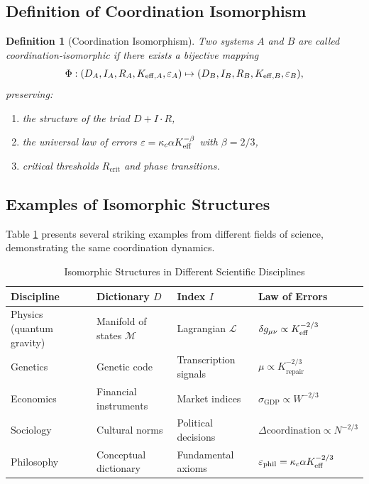 \documentclass[12pt,a4paper]{article}
\newcommand{\kappac}{\kappa_c}
\newcommand{\eps}{\varepsilon}
\newcommand{\betaf}{\beta}
\newcommand{\Rcrit}{R_{\mathrm{crit}}}
\newtheorem{definition}{Definition}[section]
\begin{document}
	\subsection{Definition of Coordination Isomorphism}
	
	\begin{definition}[Coordination Isomorphism]
		Two systems \(A\) and \(B\) are called coordination-isomorphic if there exists a bijective mapping
		\[
		\Phi: (D_A, I_A, R_A, \Keff[A], \eps_A) \mapsto (D_B, I_B, R_B, \Keff[B], \eps_B),
		\]
		preserving:
		\begin{enumerate}
			\item the structure of the triad \(D+I\cdot R\),
			\item the universal law of errors \(\eps = \kappac \alpha \Keff^{-\betaf}\) with \(\betaf = 2/3\),
			\item critical thresholds \(\Rcrit\) and phase transitions.
		\end{enumerate}
	\end{definition}
	
	\subsection{Examples of Isomorphic Structures}
	
	Table \ref{tab:isomorphisms} presents several striking examples from different fields of science, demonstrating the same coordination dynamics.
	
	\begin{table}[H]
		\centering
		\caption{Isomorphic Structures in Different Scientific Disciplines}
		\label{tab:isomorphisms}
		\footnotesize
		\begin{tabular}{p{2.8cm}p{3cm}p{3cm}p{3.5cm}}
			\toprule
			\textbf{Discipline} & \textbf{Dictionary \(D\)} & \textbf{Index \(I\)} & \textbf{Law of Errors} \\
			\midrule
			Physics (quantum gravity) & Manifold of states \(\mathcal{M}\) & Lagrangian \(\mathcal{L}\) & \(\delta g_{\mu\nu} \propto \Keff^{-2/3}\) \\
			Genetics & Genetic code & Transcription signals & \(\mu \propto K_{\mathrm{repair}}^{-2/3}\) \\
			Economics & Financial instruments & Market indices & \(\sigma_{\mathrm{GDP}} \propto W^{-2/3}\) \\
			Sociology & Cultural norms & Political decisions & \(\Delta \text{coordination} \propto N^{-2/3}\) \\
			Philosophy & Conceptual dictionary & Fundamental axioms & \(\eps_{\text{phil}} = \kappac \alpha \Keff^{-2/3}\) \\
			\bottomrule
		\end{tabular}
	\end{table}
	
\end{document}
